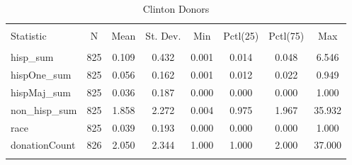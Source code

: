 
\begin{table}[!htbp] \centering 
  \caption{Clinton Donors} 
  \label{} 
\scriptsize 
\begin{tabular}{@{\extracolsep{5pt}}lccccccc} 
\\[-1.8ex]\hline 
\hline \\[-1.8ex] 
Statistic & \multicolumn{1}{c}{N} & \multicolumn{1}{c}{Mean} & \multicolumn{1}{c}{St. Dev.} & \multicolumn{1}{c}{Min} & \multicolumn{1}{c}{Pctl(25)} & \multicolumn{1}{c}{Pctl(75)} & \multicolumn{1}{c}{Max} \\ 
\hline \\[-1.8ex] 
hisp\_sum & 825 & 0.109 & 0.432 & 0.001 & 0.014 & 0.048 & 6.546 \\ 
hispOne\_sum & 825 & 0.056 & 0.162 & 0.001 & 0.012 & 0.022 & 0.949 \\ 
hispMaj\_sum & 825 & 0.036 & 0.187 & 0.000 & 0.000 & 0.000 & 1.000 \\ 
non\_hisp\_sum & 825 & 1.858 & 2.272 & 0.004 & 0.975 & 1.967 & 35.932 \\ 
race & 825 & 0.039 & 0.193 & 0.000 & 0.000 & 0.000 & 1.000 \\ 
donationCount & 826 & 2.050 & 2.344 & 1.000 & 1.000 & 2.000 & 37.000 \\ 
\hline \\[-1.8ex] 
\end{tabular} 
\end{table} 
